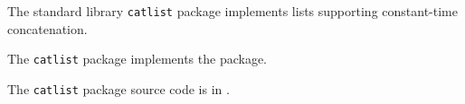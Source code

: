 
The standard library {\tt catlist} package implements lists supporting constant-time concatenation.

The {\tt catlist} package implements the  package.

The {\tt catlist} package source code is in .
